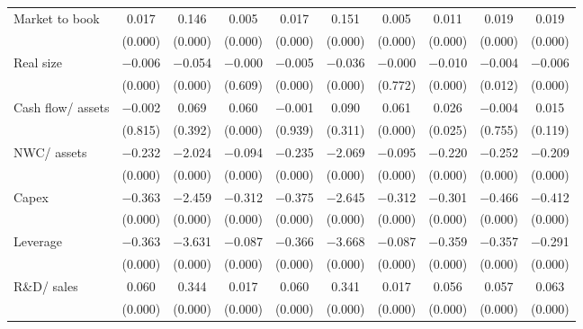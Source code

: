 {\begin{longtable}{l*{9}{c}}
\addlinespace
Market to book      &       0.017&       0.146&       0.005&       0.017&       0.151&       0.005&       0.011&       0.019&       0.019\\
                    &     (0.000)&     (0.000)&     (0.000)&     (0.000)&     (0.000)&     (0.000)&     (0.000)&     (0.000)&     (0.000)\\
\addlinespace
Real size           &    $-$0.006&    $-$0.054&    $-$0.000&    $-$0.005&    $-$0.036&    $-$0.000&    $-$0.010&    $-$0.004&    $-$0.006\\
                    &     (0.000)&     (0.000)&     (0.609)&     (0.000)&     (0.000)&     (0.772)&     (0.000)&     (0.012)&     (0.000)\\
\addlinespace
Cash flow/ assets   &    $-$0.002&       0.069&       0.060&    $-$0.001&       0.090&       0.061&       0.026&    $-$0.004&       0.015\\
                    &     (0.815)&     (0.392)&     (0.000)&     (0.939)&     (0.311)&     (0.000)&     (0.025)&     (0.755)&     (0.119)\\
\addlinespace
NWC/ assets         &    $-$0.232&    $-$2.024&    $-$0.094&    $-$0.235&    $-$2.069&    $-$0.095&    $-$0.220&    $-$0.252&    $-$0.209\\
                    &     (0.000)&     (0.000)&     (0.000)&     (0.000)&     (0.000)&     (0.000)&     (0.000)&     (0.000)&     (0.000)\\
\addlinespace
Capex               &    $-$0.363&    $-$2.459&    $-$0.312&    $-$0.375&    $-$2.645&    $-$0.312&    $-$0.301&    $-$0.466&    $-$0.412\\
                    &     (0.000)&     (0.000)&     (0.000)&     (0.000)&     (0.000)&     (0.000)&     (0.000)&     (0.000)&     (0.000)\\
\addlinespace
Leverage            &    $-$0.363&    $-$3.631&    $-$0.087&    $-$0.366&    $-$3.668&    $-$0.087&    $-$0.359&    $-$0.357&    $-$0.291\\
                    &     (0.000)&     (0.000)&     (0.000)&     (0.000)&     (0.000)&     (0.000)&     (0.000)&     (0.000)&     (0.000)\\
\addlinespace
R\&D/ sales         &       0.060&       0.344&       0.017&       0.060&       0.341&       0.017&       0.056&       0.057&       0.063\\
                    &     (0.000)&     (0.000)&     (0.000)&     (0.000)&     (0.000)&     (0.000)&     (0.000)&     (0.000)&     (0.000)\\

\end{longtable}}

